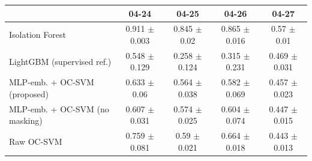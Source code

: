 \begin{tabular}{lcccc}
\toprule
 & 04-24 & 04-25 & 04-26 & 04-27 \\
\midrule
Isolation Forest & 0.911 $\pm$ 0.003 & 0.845 $\pm$ 0.02 & 0.865 $\pm$ 0.016 & 0.57 $\pm$ 0.01 \\
LightGBM (supervised ref.) & 0.548 $\pm$ 0.129 & 0.258 $\pm$ 0.124 & 0.315 $\pm$ 0.231 & 0.469 $\pm$ 0.031 \\
MLP-emb. + OC-SVM (proposed) & 0.633 $\pm$ 0.06 & 0.564 $\pm$ 0.038 & 0.582 $\pm$ 0.069 & 0.457 $\pm$ 0.023 \\
MLP-emb. + OC-SVM (no masking) & 0.607 $\pm$ 0.031 & 0.574 $\pm$ 0.025 & 0.604 $\pm$ 0.074 & 0.447 $\pm$ 0.015 \\
Raw OC-SVM & 0.759 $\pm$ 0.081 & 0.59 $\pm$ 0.021 & 0.664 $\pm$ 0.018 & 0.443 $\pm$ 0.013 \\
\bottomrule
\end{tabular}